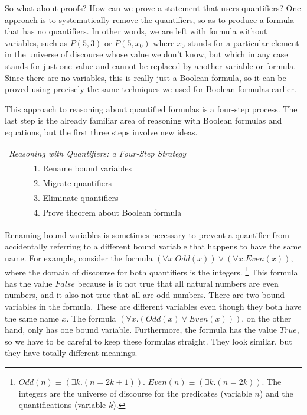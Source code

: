 {So what about proofs? How can we prove a statement that users quantifiers?
One approach is to systematically
remove the quantifiers, so as to produce a formula that has no quantifiers.
In other words, we
are left with formula without variables, such as $P(5,3)$ or $P(5,x_0)$ where
$x_0$ stands for a particular element in the universe of discourse whose value
we don't know, but which in any case stands for just one value and cannot
be replaced by another variable or formula.
Since there are no variables, this is really just a Boolean formula,
so it can be proved using precisely the same techniques we used for Boolean
formulas earlier.

This approach to reasoning about quantified formulas is a four-step process.
The last step is the already familiar area of reasoning
with Boolean formulas and equations,
but the first three steps involve new ideas.

\begin{center}
\begin{tabular} {l}
\emph{Reasoning with Quantifiers: a Four-Step Strategy} \\
~~~~~~1. Rename bound variables \\
~~~~~~2. Migrate quantifiers \\
~~~~~~3. Eliminate quantifiers \\
~~~~~~4. Prove theorem about Boolean formula \\
\end{tabular}
\label{four-step-strategy-quantifiers}
\end{center}

Renaming bound variables is sometimes necessary to prevent
a quantifier from accidentally referring to a different bound variable
that happens to have the same name.
For example, consider the formula
$(\forall x.Odd(x)) \vee (\forall x.Even(x))$,
where the domain of discourse for both quantifiers is the integers.
\footnote{$Odd(n) \equiv (\exists k.(n = 2k+1))$.
\label{even-number-predicate-Even}
$Even(n) \equiv (\exists k.(n = 2k))$.
The integers are the universe of discourse for the predicates (variable $n$)
and the quantifications (variable $k$).}
This formula has the value $False$ because is it not true
that all natural numbers are even numbers,
and it also not true that all are odd numbers.
There are two bound variables in the formula.
These are different variables even though they both have
the same name $x$.
The formula $(\forall x.(Odd(x) \vee Even(x)))$, on the other hand,
only has one bound variable.
Furthermore, the formula has the value $True$,
so we have to be careful to keep these formulas straight.
They look similar, but they have totally different meanings.

}
